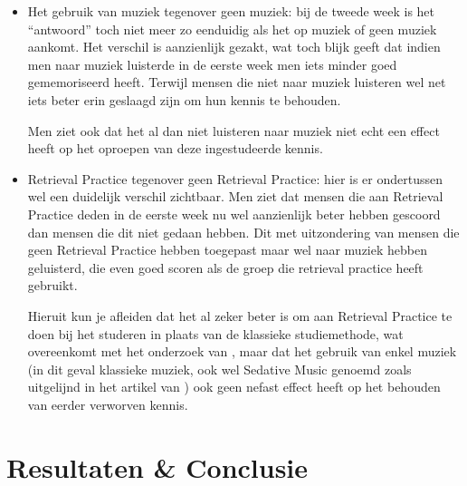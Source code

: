 \documentclass{hogent-article}
\begin{document}
\begin{itemize}
    \item Het gebruik van muziek tegenover geen muziek: bij de tweede week is het “antwoord” toch niet meer zo eenduidig als het op muziek of geen muziek aankomt. Het verschil is aanzienlijk gezakt, wat toch blijk geeft dat indien men naar muziek luisterde in de eerste week men iets minder goed gememoriseerd heeft. Terwijl mensen die niet naar muziek luisteren wel net iets beter erin geslaagd zijn om hun kennis te behouden.
    \\
    \par
    \noindent
    Men ziet ook dat het al dan niet luisteren naar muziek niet echt een effect heeft op het oproepen van deze ingestudeerde kennis.
    \\
    \item Retrieval Practice tegenover geen Retrieval Practice: hier is er ondertussen wel een duidelijk verschil zichtbaar. Men ziet dat mensen die aan Retrieval Practice deden in de eerste week nu wel aanzienlijk beter hebben gescoord dan mensen die dit niet gedaan hebben. Dit met uitzondering van mensen die geen Retrieval Practice hebben toegepast maar wel naar muziek hebben geluisterd, die even goed scoren als de groep die retrieval practice heeft gebruikt. \\
    \par
    \noindent
    Hieruit kun je afleiden dat het al zeker beter is om aan Retrieval Practice te doen bij het studeren in plaats van de klassieke studiemethode, wat overeenkomt met het onderzoek van \textcite{Roediger2006}, maar dat het gebruik van enkel muziek (in dit geval klassieke muziek, ook wel Sedative Music genoemd zoals uitgelijnd in het artikel van \textcite{Dolegui2013}) ook geen nefast effect heeft op het behouden van eerder verworven kennis.
    
\end{itemize}
    

\section{Resultaten \& Conclusie }
\end{document}
